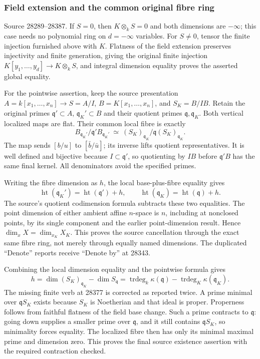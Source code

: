 \subsubsection{Field extension and the common original fibre ring}\label{algebra-proof-026-field-extension-and-the-common-original-fibre-ring}

Source 28289--28387. If \(S=0\), then \(K\otimes_k S=0\) and both dimensions are \(-\infty\); this case needs no polynomial ring on \(d=-\infty\) variables. For \(S\ne0\), tensor the finite injection furnished above with \(K\). Flatness of the field extension preserves injectivity and finite generation, giving the original finite injection \(K[y_1,\ldots,y_d]\to K\otimes_kS\), and integral dimension equality proves the asserted global equality.

For the pointwise assertion, keep the source presentation \(A=k[x_1,\ldots,x_n]\to S=A/I\), \(B=K[x_1,\ldots,x_n]\), and \(S_K=B/IB\). Retain the original primes \(\mathfrak q'\subset A\), \(\mathfrak q_K'\subset B\) and their quotient primes \(\mathfrak q,\mathfrak q_K\). Both vertical localized maps are flat. Their common local fibre is exactly \[
 B_{\mathfrak q_K'}/\mathfrak q'B_{\mathfrak q_K'}
 \ \simeq\
 (S_K)_{\mathfrak q_K}/\mathfrak q(S_K)_{\mathfrak q_K}.
\] The map sends \([b/u]\) to \([\bar b/\bar u]\); its inverse lifts quotient representatives. It is well defined and bijective because \(I\subset\mathfrak q'\), so quotienting by \(IB\) before \(\mathfrak q'B\) has the same final kernel. All denominators avoid the specified primes.

Writing the fibre dimension as \(h\), the local base-plus-fibre equality gives \[
 \operatorname{ht}(\mathfrak q_K')
     =\operatorname{ht}(\mathfrak q')+h,\qquad
 \operatorname{ht}(\mathfrak q_K)
     =\operatorname{ht}(\mathfrak q)+h.
\] The source's quotient codimension formula subtracts these two equalities. The point dimension of either ambient affine \(n\)-space is \(n\), including at nonclosed points, by its single component and the earlier point-dimension result. Hence \(\dim_xX=\dim_{x_K}X_K\). This proves the source cancellation through the exact same fibre ring, not merely through equally named dimensions. The duplicated ``Denote'' reports receive ``Denote by'' at 28343.

Combining the local dimension equality and the pointwise formula gives \[
 h=\dim(S_K)_{\mathfrak q_K}-\dim S_{\mathfrak q}
   =\operatorname{trdeg}_k\kappa(\mathfrak q)
      -\operatorname{trdeg}_K\kappa(\mathfrak q_K).
\] The missing finite verb at 28377 is corrected as reported twice. A prime minimal over \(\mathfrak qS_K\) exists because \(S_K\) is Noetherian and that ideal is proper. Properness follows from faithful flatness of the field base change. Such a prime contracts to \(\mathfrak q\): going down supplies a smaller prime over \(\mathfrak q\), and it still contains \(\mathfrak qS_K\), so minimality forces equality. The localized fibre then has only its minimal maximal prime and dimension zero. This proves the final source existence assertion with the required contraction checked.

